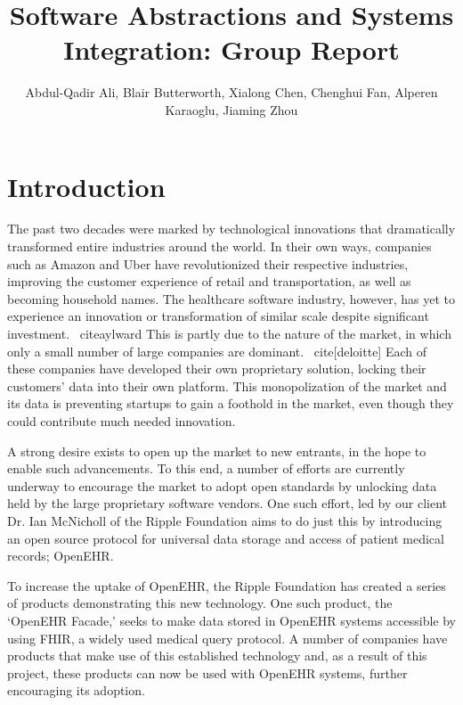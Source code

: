 \documentclass[sigconf]{acmart}
\begin{document}
\title{Software Abstractions and Systems Integration: Group Report}

\author{Abdul-Qadir Ali,  Blair Butterworth, Xialong Chen,  Chenghui Fan,  Alperen Karaoglu, Jiaming Zhou}

\newcommand\FIXME[1]{{\color{red}\textbf{FIXME: #1}}}

\maketitle

\tableofcontents 

\section{Introduction}
The past two decades were marked by technological innovations that dramatically transformed entire industries around the world. In their own ways, companies such as Amazon and Uber have revolutionized their respective industries, improving the customer experience of retail and transportation, as well as becoming household names. The healthcare software industry, however, has yet to experience an innovation or transformation of similar scale despite significant investment. ~cite{aylward} This is partly due to the nature of the market, in which only a small number of large companies are dominant. ~cite[deloitte] Each of these companies have developed their own proprietary solution, locking their customers’ data into their own platform. This monopolization of the market and its data is preventing startups to gain a foothold in the market, even though they could contribute much needed innovation.

A strong desire exists to open up the market to new entrants, in the hope to enable such advancements. To this end, a number of efforts are currently underway to encourage the market to adopt open standards by unlocking data held by the large proprietary software vendors. One such effort, led by our client Dr. Ian McNicholl of the Ripple Foundation aims to do just this by introducing an open source protocol for universal data storage and access of patient medical records; OpenEHR. 

To increase the uptake of OpenEHR, the Ripple Foundation has created a series of products demonstrating this new technology. One such product, the ‘OpenEHR Facade,’ seeks to make data stored in OpenEHR systems accessible by using FHIR, a widely used medical query protocol. A number of companies have products that make use of this established technology and, as a result of this project, these products can now be used with OpenEHR systems, further encouraging its adoption. 
\end{document}
